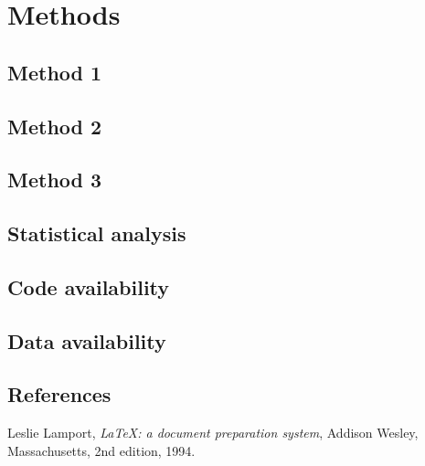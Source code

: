 \documentclass[twocolumn, linenumbers, superscriptaddress]{revtex4-1}
\begin{document}
	\newpage

	\section*{Methods}
		\subsection*{Method 1}
			\blindtext[3]
			
		\subsection*{Method 2}
			\blindtext[3]
			
		\subsection*{Method 3}
			\blindtext[3]
			
		\subsection*{Statistical analysis}
			\blindtext[3]
			
		\subsection*{Code availability}
			\blindtext[3]
			
		\subsection*{Data availability}
			\blindtext[3]

	\begin{thebibliography}{50}
		\section*{References}	
			Leslie Lamport,
			\textit{\LaTeX: a document preparation system},
			Addison Wesley, Massachusetts,
			2nd edition,
			1994.

	\end{thebibliography}
\end{document}
